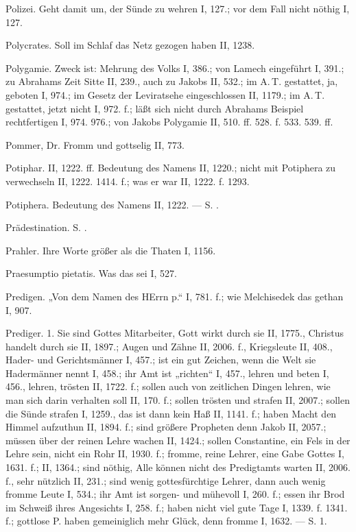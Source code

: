 Polizei. Geht damit um, der Sünde zu wehren I, 127.; vor dem Fall nicht nöthig I, 127.

Polycrates. Soll im Schlaf das Netz gezogen haben II, 1238.

Polygamie. Zweck ist: Mehrung des Volks I, 386.; von Lamech eingeführt I, 391.; zu Abrahams Zeit Sitte II, 239., auch zu Jakobs II, 532.; im A.\,T. gestattet, ja, geboten I, 974.; im Gesetz der Leviratsehe eingeschlossen II, 1179.; im A.\,T. gestattet, jetzt nicht I, 972. f.; läßt sich nicht durch Abrahams Beispiel rechtfertigen I, 974. 976.; von Jakobs Polygamie II, 510. ff. 528. f. 533. 539. ff.

Pommer, Dr. Fromm und gottselig II, 773.

Potiphar. II, 1222. ff. Bedeutung des Namens II, 1220.; nicht mit Potiphera zu verwechseln II, 1222. 1414. f.; was er war II, 1222. f. 1293.

Potiphera. Bedeutung des Namens II, 1222. — S. .

Prädestination. S. .

Prahler. Ihre Worte größer als die Thaten I, 1156.

Praesumptio pietatis. Was das sei I, 527.

Predigen. „Von dem Namen des HErrn p.“ I, 781. f.; wie Melchisedek das gethan I, 907.

Prediger. 1.  Sie sind Gottes Mitarbeiter, Gott wirkt durch sie II, 1775., Christus handelt durch sie II, 1897.; Augen und Zähne II, 2006. f., Kriegsleute II, 408., Hader- und Gerichtsmänner I, 457.; ist ein gut Zeichen, wenn die Welt sie Hadermänner nennt I, 458.; ihr Amt ist „richten“ I, 457., lehren und beten I, 456., lehren, trösten II, 1722. f.; sollen auch von zeitlichen Dingen lehren, wie man sich darin verhalten soll II, 170. f.; sollen trösten und strafen II, 2007.; sollen die Sünde strafen I, 1259., das ist dann kein Haß II, 1141. f.; haben Macht den Himmel aufzuthun II, 1894. f.; sind größere Propheten denn Jakob II, 2057.; müssen über der reinen Lehre wachen II, 1424.; sollen Constantine, ein Fels in der Lehre sein, nicht ein Rohr II, 1930. f.; fromme, reine Lehrer, eine Gabe Gottes I, 1631. f.; II, 1364.; sind nöthig, Alle können nicht des Predigtamts warten II, 2006. f., sehr nützlich II, 231.; sind wenig gottesfürchtige Lehrer, dann auch wenig fromme Leute I, 534.; ihr Amt ist sorgen- und mühevoll I, 260. f.; essen ihr Brod im Schweiß ihres Angesichts I, 258. f.; haben nicht viel gute Tage I, 1339. f. 1341. f.; gottlose P. haben gemeiniglich mehr Glück, denn fromme I, 1632. — S.  1.

